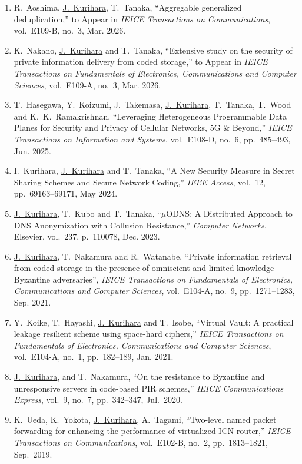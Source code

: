 \begin{enumerate}
  \item R.~Aoshima, \underline{J.~Kurihara}, T.~Tanaka, ``Aggregable generalized deduplication,'' to Appear in \textit{IEICE Transactions on Communications}, vol.~E109-B, no.~3, Mar. 2026.
  \item K.~Nakano, \underline{J.~Kurihara} and T.~Tanaka, ``Extensive study on the security of private information delivery from coded storage,'' to Appear in \textit{IEICE Transactions on Fundamentals of Electronics, Communications and Computer Sciences}, vol.~E109-A, no.~3, Mar. 2026.
  \item T.~Hasegawa, Y.~Koizumi, J.~Takemasa, \underline{J.~Kurihara}, T.~Tanaka, T.~Wood and K.~K.~Ramakrishnan, ``Leveraging Heterogeneous Programmable Data Planes for Security and Privacy of Cellular Networks, 5G \& Beyond,'' \textit{IEICE Transactions on Information and Systems}, vol.~E108-D, no.~6, pp.~485--493, Jun. 2025.
  \item I.~Kurihara, \underline{J.~Kurihara} and T.~Tanaka, ``A New Security Measure in Secret Sharing Schemes and Secure Network Coding,'' \textit{IEEE Access}, vol.~12, pp.~69163--69171, May 2024.
  \item \underline{J.~Kurihara}, T.~Kubo and T.~Tanaka, ``$\mu$ODNS: A Distributed Approach to DNS Anonymization with Collusion Resistance,'' \textit{Computer Networks}, Elsevier, vol.~237, p.~110078, Dec. 2023.
  \item \underline{J.~Kurihara}, T.~Nakamura and R.~Watanabe, ``Private information retrieval from coded storage in the presence of omniscient and limited-knowledge Byzantine adversaries'', \textit{IEICE Transactions on Fundamentals of Electronics, Communications and Computer Sciences}, vol.~E104-A, no.~9, pp.~1271--1283, Sep. 2021.
  \item Y.~Koike, T.~Hayashi, \underline{J.~Kurihara} and T.~Isobe, ``Virtual Vault: A practical leakage resilient scheme using space-hard ciphers,'' \textit{IEICE Transactions on Fundamentals of Electronics, Communications and Computer Sciences}, vol.~E104-A, no.~1, pp.~182--189, Jan. 2021.
  \item \underline{J.~Kurihara}, and T.~Nakamura, ``On the resistance to Byzantine and unresponsive servers in code-based PIR schemes,'' \textit{IEICE Communications Express}, vol.~9, no.~7, pp.~342--347, Jul.~2020.
  \item K.~Ueda, K.~Yokota, \underline{J.~Kurihara}, A.~Tagami, ``Two-level named packet forwarding for enhancing the performance of virtualized ICN router,'' \textit{IEICE Transactions on Communications}, vol.~E102-B, no.~2, pp.~1813--1821, Sep.~2019.

\end{enumerate}
